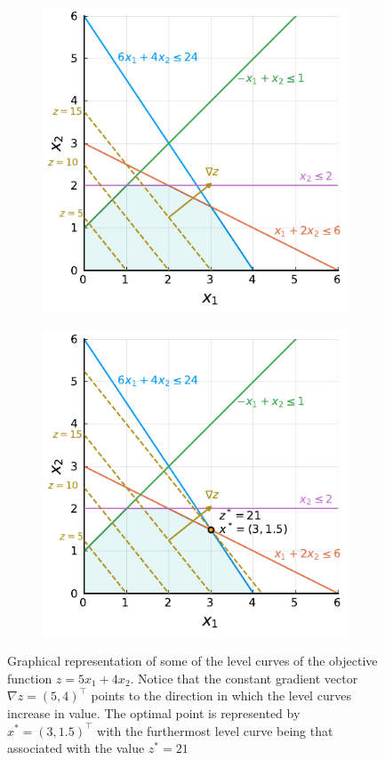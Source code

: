 \begin{figure}[h]
	\begin{subfigure}{0.45\textwidth}
		\includegraphics[scale=0.99]{part_1/chapter_1/figures/figure1-4a.pdf}  
		\caption{} \label{p1c1:fig:level_curves_a}	
	\end{subfigure}
	\begin{subfigure}{0.45\textwidth}
		\includegraphics[scale=0.99]{part_1/chapter_1/figures/figure1-4b.pdf}
		\caption{} \label{p1c1:fig:level_curves_b}	 
	\end{subfigure}
	\caption{Graphical representation of some of the level curves of the objective function $z = 5x_1 + 4x_2$. Notice that the constant gradient vector $\nabla z = (5,4)^\top$ points to the direction in which the level curves increase in value. The optimal point is represented by $x^*=(3, 1.5)^\top$ with the furthermost level curve being that associated with the value $z^* = 21$}	
\end{figure}

